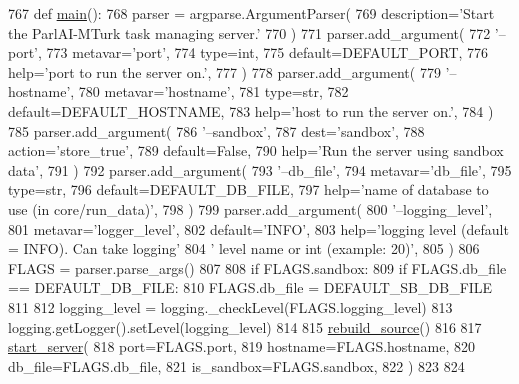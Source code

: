 \begin{DoxyCode}
767 \textcolor{keyword}{def }\hyperlink{namespaceparlai_1_1mturk_1_1webapp_1_1server_a1919be0d74781c0b9f579daf974d9f53}{main}():
768     parser = argparse.ArgumentParser(
769         description=\textcolor{stringliteral}{'Start the ParlAI-MTurk task managing server.'}
770     )
771     parser.add\_argument(
772         \textcolor{stringliteral}{'--port'},
773         metavar=\textcolor{stringliteral}{'port'},
774         type=int,
775         default=DEFAULT\_PORT,
776         help=\textcolor{stringliteral}{'port to run the server on.'},
777     )
778     parser.add\_argument(
779         \textcolor{stringliteral}{'--hostname'},
780         metavar=\textcolor{stringliteral}{'hostname'},
781         type=str,
782         default=DEFAULT\_HOSTNAME,
783         help=\textcolor{stringliteral}{'host to run the server on.'},
784     )
785     parser.add\_argument(
786         \textcolor{stringliteral}{'--sandbox'},
787         dest=\textcolor{stringliteral}{'sandbox'},
788         action=\textcolor{stringliteral}{'store\_true'},
789         default=\textcolor{keyword}{False},
790         help=\textcolor{stringliteral}{'Run the server using sandbox data'},
791     )
792     parser.add\_argument(
793         \textcolor{stringliteral}{'--db\_file'},
794         metavar=\textcolor{stringliteral}{'db\_file'},
795         type=str,
796         default=DEFAULT\_DB\_FILE,
797         help=\textcolor{stringliteral}{'name of database to use (in core/run\_data)'},
798     )
799     parser.add\_argument(
800         \textcolor{stringliteral}{'--logging\_level'},
801         metavar=\textcolor{stringliteral}{'logger\_level'},
802         default=\textcolor{stringliteral}{'INFO'},
803         help=\textcolor{stringliteral}{'logging level (default = INFO). Can take logging'}
804         \textcolor{stringliteral}{' level name or int (example: 20)'},
805     )
806     FLAGS = parser.parse\_args()
807 
808     \textcolor{keywordflow}{if} FLAGS.sandbox:
809         \textcolor{keywordflow}{if} FLAGS.db\_file == DEFAULT\_DB\_FILE:
810             FLAGS.db\_file = DEFAULT\_SB\_DB\_FILE
811 
812     logging\_level = logging.\_checkLevel(FLAGS.logging\_level)
813     logging.getLogger().setLevel(logging\_level)
814 
815     \hyperlink{namespaceparlai_1_1mturk_1_1webapp_1_1server_a0ce17c85e37b7734ab2fbaca711cb45f}{rebuild\_source}()
816 
817     \hyperlink{namespaceparlai_1_1mturk_1_1webapp_1_1server_a3faf7a84baf92a6b0863ab87a0015c41}{start\_server}(
818         port=FLAGS.port,
819         hostname=FLAGS.hostname,
820         db\_file=FLAGS.db\_file,
821         is\_sandbox=FLAGS.sandbox,
822     )
823 
824 
\end{DoxyCode}
\mbox{\label{namespaceparlai_1_1mturk_1_1webapp_1_1server_abe6ddbf97d0e5c26315fa927ed076489}} 
